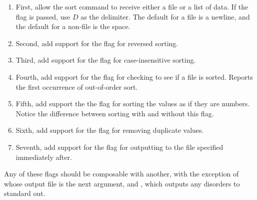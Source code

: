 \begin{enumerate}[label=(\alph*)]
    \item First, allow the sort command to receive either a file or a list of data. If the  flag is passed, use $D$ as the delimiter. The default for a file is a newline, and the default for a non-file is the space.
    \item Second, add support for the  flag for reversed sorting.
    \item Third, add support for the  flag for case-insensitive sorting.
    \item Fourth, add support for the  flag for checking to see if a file is sorted. Reports the first occurrence of out-of-order sort.
    \item Fifth, add support the the  flag for sorting the values as if they are numbers. Notice the difference between sorting  with and without this flag.
    \item Sixth, add support for the  flag for removing duplicate values.
    \item Seventh, add support for the  flag for outputting to the file specified immediately after.
\end{enumerate}
Any of these flags should be composable with another, with the exception of  whose output file is the next argument, and , which outputs any disorders to standard out.



